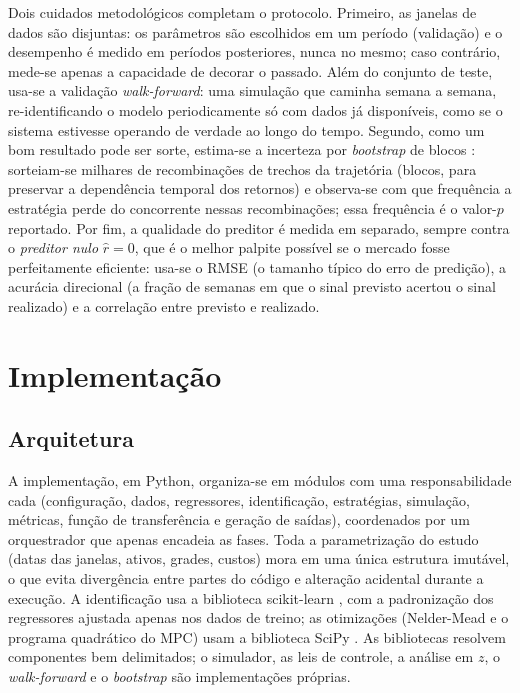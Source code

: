 \documentclass[conference]{IEEEtran}
\begin{document}
Dois cuidados metodológicos completam o protocolo. Primeiro, as janelas de dados são disjuntas: os parâmetros são escolhidos em um período (validação) e o desempenho é medido em períodos posteriores, nunca no mesmo; caso contrário, mede-se apenas a capacidade de decorar o passado. Além do conjunto de teste, usa-se a validação \emph{walk-forward}: uma simulação que caminha semana a semana, re-identificando o modelo periodicamente só com dados já disponíveis, como se o sistema estivesse operando de verdade ao longo do tempo. Segundo, como um bom resultado pode ser sorte, estima-se a incerteza por \emph{bootstrap} de blocos \cite{kunsch1989}: sorteiam-se milhares de recombinações de trechos da trajetória (blocos, para preservar a dependência temporal dos retornos) e observa-se com que frequência a estratégia perde do concorrente nessas recombinações; essa frequência é o valor-$p$ reportado. Por fim, a qualidade do preditor é medida em separado, sempre contra o \emph{preditor nulo} $\hat{r}=0$, que é o melhor palpite possível se o mercado fosse perfeitamente eficiente: usa-se o RMSE (o tamanho típico do erro de predição), a acurácia direcional (a fração de semanas em que o sinal previsto acertou o sinal realizado) e a correlação entre previsto e realizado.

\section{Implementação}\label{sec:implementacao}

\subsection{Arquitetura}

A implementação, em Python, organiza-se em módulos com uma responsabilidade cada (configuração, dados, regressores, identificação, estratégias, simulação, métricas, função de transferência e geração de saídas), coordenados por um orquestrador que apenas encadeia as fases. Toda a parametrização do estudo (datas das janelas, ativos, grades, custos) mora em uma única estrutura imutável, o que evita divergência entre partes do código e alteração acidental durante a execução. A identificação usa a biblioteca scikit-learn \cite{pedregosa2011}, com a padronização dos regressores ajustada apenas nos dados de treino; as otimizações (Nelder-Mead e o programa quadrático do MPC) usam a biblioteca SciPy \cite{virtanen2020}. As bibliotecas resolvem componentes bem delimitados; o simulador, as leis de controle, a análise em $z$, o \emph{walk-forward} e o \emph{bootstrap} são implementações próprias.
\end{document}
